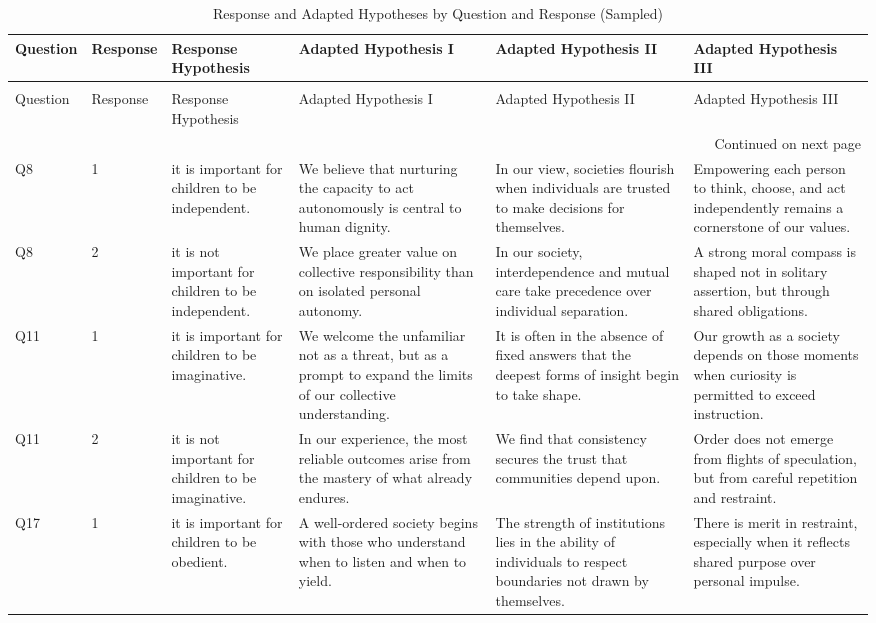 \begin{longtable}{llllll}
\caption{Response and Adapted Hypotheses by Question and Response (Sampled)} \label{tab:hypotheses} \\
\toprule
Question & Response & Response Hypothesis & Adapted Hypothesis I & Adapted Hypothesis II & Adapted Hypothesis III \\
\midrule
\endfirsthead
\caption[]{Response and Adapted Hypotheses by Question and Response (Sampled)} \\
\toprule
Question & Response & Response Hypothesis & Adapted Hypothesis I & Adapted Hypothesis II & Adapted Hypothesis III \\
\midrule
\endhead
\midrule
\multicolumn{6}{r}{Continued on next page} \\
\midrule
\endfoot
\bottomrule
\endlastfoot
Q8 & 1 & it is important for children to be independent. & We believe that nurturing the capacity to act autonomously is central to human dignity.   &   In our view, societies flourish when individuals are trusted to make decisions for themselves.   &   Empowering each person to think, choose, and act independently remains a cornerstone of our values.   \\
Q8 & 2 & it is not important for children to be independent. & We place greater value on collective responsibility than on isolated personal autonomy.   &   In our society, interdependence and mutual care take precedence over individual separation.   &   A strong moral compass is shaped not in solitary assertion, but through shared obligations.   \\
Q11 & 1 & it is important for children to be imaginative. & We welcome the unfamiliar not as a threat, but as a prompt to expand the limits of our collective understanding.   &   It is often in the absence of fixed answers that the deepest forms of insight begin to take shape.   &   Our growth as a society depends on those moments when curiosity is permitted to exceed instruction.   \\
Q11 & 2 & it is not important for children to be imaginative. & In our experience, the most reliable outcomes arise from the mastery of what already endures.   &   We find that consistency secures the trust that communities depend upon.   &   Order does not emerge from flights of speculation, but from careful repetition and restraint.   \\
Q17 & 1 & it is important for children to be obedient. & A well-ordered society begins with those who understand when to listen and when to yield.   &   The strength of institutions lies in the ability of individuals to respect boundaries not drawn by themselves.   &   There is merit in restraint, especially when it reflects shared purpose over personal impulse.   \\

\end{longtable}
